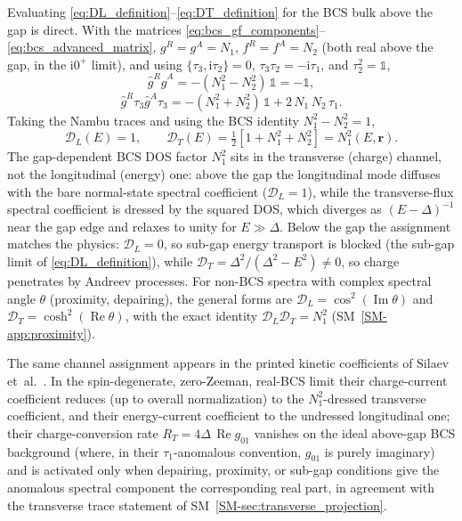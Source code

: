 \documentclass[
  aps,
  prb,
  preprint,
  superscriptaddress,
  longbibliography,
  nofootinbib
]{revtex4-2}
\newcommand{\ii}{\mathrm{i}}
\newcommand{\br}{\mathbf{r}}
\newcommand{\DOS}{N_1}
\providecommand{\openone}{}\renewcommand{\openone}{\mathds{1}}
\newcommand{\Real}{\operatorname{Re}}
\newcommand{\Imag}{\operatorname{Im}}
\begin{document}
Evaluating \cref{eq:DL_definition}--\cref{eq:DT_definition} for the
BCS bulk above the gap is direct. With the matrices
\cref{eq:bcs_gf_components}--\cref{eq:bcs_advanced_matrix},
\(g^R=g^A=\DOS\), \(f^R=f^A=N_2\) (both real above the gap, in the
\(\ii0^{+}\) limit), and using
\(\{\tau_3,\ii\tau_2\}=0\), \(\tau_3\tau_2=-\ii\tau_1\), and
\(\tau_2^2=\openone\),
\begin{equation}
  \hat{g}^R\hat{g}^A
  =
  -(\DOS^2-N_2^2)\,\openone
  =
  -\openone ,
  \label{eq:gRgA_BCS_bulk}
\end{equation}
\begin{equation}
  \hat{g}^R\tau_3\hat{g}^A\tau_3
  =
  -(\DOS^2+N_2^2)\,\openone
  + 2\,\DOS\,N_2\,\tau_1 .
  \label{eq:gRtau3gAtau3_BCS_bulk}
\end{equation}
Taking the Nambu traces and using the BCS identity
\(\DOS^2-N_2^2=1\),
\begin{equation}
  \mathcal{D}_L(E)
  =
  1,
  \qquad
  \mathcal{D}_T(E)
  =
  \tfrac{1}{2}\!\left[1+\DOS^2+N_2^2\right]
  =
  \DOS^2(E,\br) .
  \label{eq:DL_DT_BCS_bulk}
\end{equation}
The gap-dependent BCS DOS factor \(\DOS^2\) sits in the transverse
(charge) channel, not the longitudinal (energy) one: above the gap the
longitudinal mode diffuses with the bare normal-state spectral coefficient
(\(\mathcal{D}_L=1\)), while the transverse-flux spectral coefficient is
dressed by the squared DOS, which diverges as \((E-\Delta)^{-1}\) near the
gap edge and relaxes to unity for \(E\gg\Delta\). Below the gap the
assignment matches the physics: \(\mathcal{D}_L=0\), so sub-gap energy
transport is blocked (the sub-gap limit of
\cref{eq:DL_definition}), while
\(\mathcal{D}_T=\Delta^2/(\Delta^2-E^2)\neq0\), so charge penetrates by
Andreev processes. For non-BCS spectra with complex spectral angle
\(\theta\) (proximity, depairing), the general forms are
\(\mathcal{D}_L=\cos^2(\Imag\theta)\) and
\(\mathcal{D}_T=\cosh^2(\Real\theta)\), with the exact identity
\(\mathcal{D}_L\mathcal{D}_T=\DOS^2\) (SM~\cref{SM-app:proximity}).

The same channel assignment appears in the printed kinetic coefficients
of Silaev et~al.~\cite{silaev2015}. In the spin-degenerate, zero-Zeeman,
real-BCS limit their charge-current coefficient reduces (up to overall
normalization) to the \(\DOS^2\)-dressed transverse coefficient, and
their energy-current coefficient to the undressed longitudinal one; their
charge-conversion rate \(R_T=4\Delta\,\Real g_{01}\) vanishes on the
ideal above-gap BCS background (where, in their \(\tau_1\)-anomalous
convention, \(g_{01}\) is purely imaginary) and is activated only when
depairing, proximity, or sub-gap conditions give the anomalous spectral
component the corresponding real part, in agreement with the transverse
trace statement of SM~\cref{SM-sec:transverse_projection}.
\end{document}

